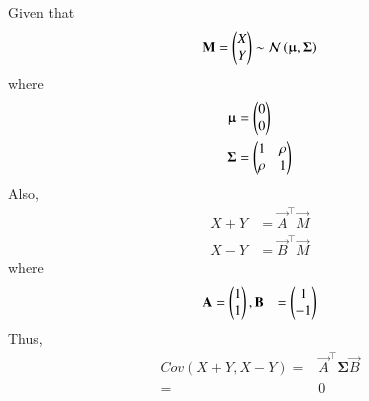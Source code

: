 Given that 
\begin{align}
 \mathbf{M} = \begin{pmatrix} X \\ Y\end{pmatrix}
 \sim  \mathcal{N}\left({\boldsymbol{\upmu}}, {\boldsymbol{\Sigma}} \right)
\end{align}
%
where 
\begin{align}
    \boldsymbol{\upmu} &= \begin{pmatrix}0 \\ 0\end{pmatrix}
    \\
\boldsymbol{\Sigma} &= \begin{pmatrix}
            1 & \rho\\
            \rho & 1 
        \end{pmatrix}
\end{align}
Also, 
\begin{align}
    X+Y &
    = \vec{A}^\top \vec{M}
    \\
    X-Y &
    =\vec{B}^\top \vec{M}
\end{align}
where
\begin{align}
 \mathbf{A} &= \begin{pmatrix}1 \\ 1\end{pmatrix}, 
    \mathbf{B} &= \begin{pmatrix}1 \\ -1\end{pmatrix}
\end{align}
Thus, 
\begin{align}
 Cov(X+Y,X-Y) =& \vec{A}^\top \boldsymbol{\Sigma} \vec{B} \\
    =&   0
\end{align}
